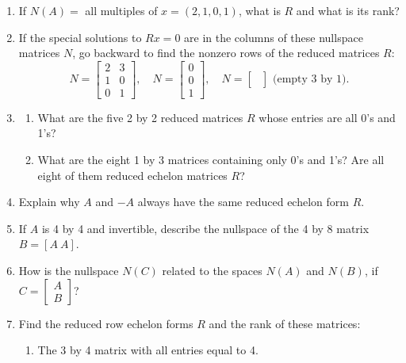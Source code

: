 \documentclass[14pt, a4paper]{article}
\begin{document}
\begin{enumerate}[resume]
    \item If $N(A) =$ all multiples of $x = (2, 1, 0, 1)$, what is $R$ and what is its rank?

    \item If the special solutions to $Rx = 0$ are in the columns of these nullspace matrices $N$, go backward to find the nonzero rows of the reduced matrices $R$:
          \[
              N = \begin{bmatrix} 2 & 3 \\ 1 & 0 \\ 0 & 1 \end{bmatrix},\quad
              N = \begin{bmatrix} 0 \\ 0 \\ 1 \end{bmatrix},\quad
              N = \begin{bmatrix}   \\   \\  \end{bmatrix} \text{ (empty 3 by 1)}.
          \]

    \item
          \begin{enumerate}
              \item What are the five 2 by 2 reduced matrices $R$ whose entries are all 0's and 1's?
              \item What are the eight 1 by 3 matrices containing only 0's and 1's? Are all eight of them reduced echelon matrices $R$?
          \end{enumerate}

    \item Explain why $A$ and $-A$ always have the same reduced echelon form $R$.

    \item If $A$ is 4 by 4 and invertible, describe the nullspace of the 4 by 8 matrix $B = [A\ A]$.

    \item How is the nullspace $N(C)$ related to the spaces $N(A)$ and $N(B)$, if $C = \begin{bmatrix} A \\ B \end{bmatrix}$?

    \item Find the reduced row echelon forms $R$ and the rank of these matrices:
          \begin{enumerate}
              \item The 3 by 4 matrix with all entries equal to 4.
          \end{enumerate}


\end{enumerate}
\end{document}
